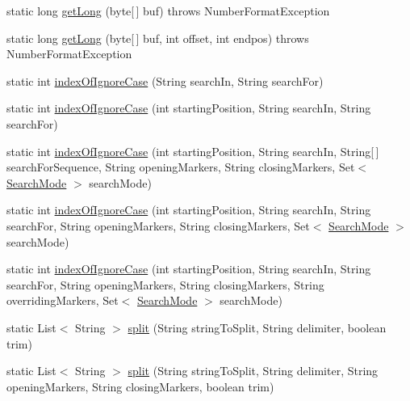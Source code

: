 \begin{DoxyCompactItemize}
static long \mbox{\hyperlink{classcom_1_1mysql_1_1cj_1_1util_1_1_string_utils_a45f323c1f54d962e1c10eb8aa13b1726}{get\+Long}} (byte\mbox{[}$\,$\mbox{]} buf)  throws Number\+Format\+Exception 
\item 
static long \mbox{\hyperlink{classcom_1_1mysql_1_1cj_1_1util_1_1_string_utils_a6d481f0c625a7ecd3642b152a6388170}{get\+Long}} (byte\mbox{[}$\,$\mbox{]} buf, int offset, int endpos)  throws Number\+Format\+Exception 
\item 
static int \mbox{\hyperlink{classcom_1_1mysql_1_1cj_1_1util_1_1_string_utils_a04e388c77ef24c2d95cdc76b3aef7be9}{index\+Of\+Ignore\+Case}} (String search\+In, String search\+For)
\item 
static int \mbox{\hyperlink{classcom_1_1mysql_1_1cj_1_1util_1_1_string_utils_a716494cab67842271dd23a566f2c493a}{index\+Of\+Ignore\+Case}} (int starting\+Position, String search\+In, String search\+For)
\item 
static int \mbox{\hyperlink{classcom_1_1mysql_1_1cj_1_1util_1_1_string_utils_a480991db62742c024fad125ac564d71f}{index\+Of\+Ignore\+Case}} (int starting\+Position, String search\+In, String\mbox{[}$\,$\mbox{]} search\+For\+Sequence, String opening\+Markers, String closing\+Markers, Set$<$ \mbox{\hyperlink{enumcom_1_1mysql_1_1cj_1_1util_1_1_string_utils_1_1_search_mode}{Search\+Mode}} $>$ search\+Mode)
\item 
static int \mbox{\hyperlink{classcom_1_1mysql_1_1cj_1_1util_1_1_string_utils_a77e89331060e523af4da7475368b0dea}{index\+Of\+Ignore\+Case}} (int starting\+Position, String search\+In, String search\+For, String opening\+Markers, String closing\+Markers, Set$<$ \mbox{\hyperlink{enumcom_1_1mysql_1_1cj_1_1util_1_1_string_utils_1_1_search_mode}{Search\+Mode}} $>$ search\+Mode)
\item 
static int \mbox{\hyperlink{classcom_1_1mysql_1_1cj_1_1util_1_1_string_utils_a50cacf56ea5db76e3094200748dda145}{index\+Of\+Ignore\+Case}} (int starting\+Position, String search\+In, String search\+For, String opening\+Markers, String closing\+Markers, String overriding\+Markers, Set$<$ \mbox{\hyperlink{enumcom_1_1mysql_1_1cj_1_1util_1_1_string_utils_1_1_search_mode}{Search\+Mode}} $>$ search\+Mode)
\item 
static List$<$ String $>$ \mbox{\hyperlink{classcom_1_1mysql_1_1cj_1_1util_1_1_string_utils_a7415fcd4dc83631e7840f2784c2332f9}{split}} (String string\+To\+Split, String delimiter, boolean trim)
\item 
static List$<$ String $>$ \mbox{\hyperlink{classcom_1_1mysql_1_1cj_1_1util_1_1_string_utils_af08e2c13d9f2391bc11c83623e23a178}{split}} (String string\+To\+Split, String delimiter, String opening\+Markers, String closing\+Markers, boolean trim)

\end{DoxyCompactItemize}
